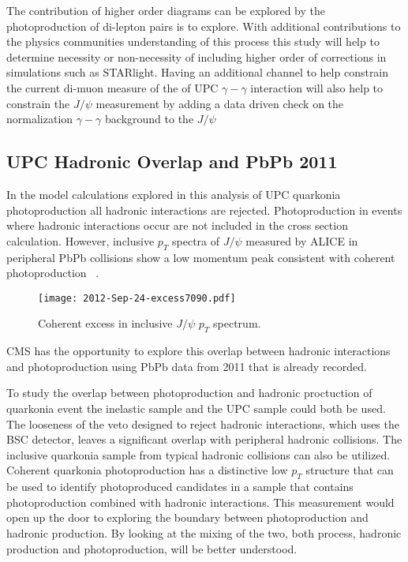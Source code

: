       The contribution of higher order diagrams can be explored by the 
	photoproduction of di-lepton pairs is to explore.
      With additional contributions to the physics communities understanding of 
	this process this study will help to determine necessity or 
	non-necessity of including higher order of corrections in simulations 
	such as STARlight.
      Having an additional channel to help constrain the current di-muon measure 
	of the of UPC $\gamma-\gamma$ interaction will also help to constrain 
	the $J/\psi$ measurement by adding a data driven check on the 
	normalization $\gamma-\gamma$ background to the $J/\psi$
      
    \subsection{UPC Hadronic Overlap and PbPb 2011}
      In the model calculations explored in this analysis of UPC quarkonia 
        photoproduction all hadronic interactions are rejected.
      Photoproduction in events where hadronic interactions occur are not 
        included in the cross section calculation.
      However, inclusive $p_{T}$ spectra of $J/\psi$ measured by ALICE in 
        peripheral PbPb collisions show a low momentum peak consistent with 
				coherent photoproduction ~\cite{aliceIclJpsi}.
			\begin{figure}[h]
				\centering
				\texttt{[image: 2012-Sep-24-excess7090.pdf]}
				\caption{Coherent excess in inclusive $J/\psi$ $p_{T}$ spectrum.}
				\label{fig:alicePtSpecLowPt}
			\end{figure}
		  CMS has the opportunity to explore this overlap between hadronic 
				interactions and photoproduction using PbPb data from 2011 that is 
				already recorded.

      To study the overlap between photoproduction and hadronic proctuction of 
				quarkonia event the inelastic sample and the UPC sample could both be
				used. 
      The looseness of the veto designed to reject hadronic interactions,
        which uses the BSC detector, leaves a significant overlap with 
				peripheral hadronic collisions. 
      The inclusive quarkonia sample from typical hadronic collisions can also 
        be utilized. 
      Coherent quarkonia photoproduction has a distinctive low $p_{T}$ structure
				that can be used to identify photoproduced candidates in a sample that 
				contains photoproduction combined with hadronic interactions.
      This measurement would open up the door to exploring the boundary between
				photoproduction and hadronic production.
      By looking at the mixing of the two, both process, hadronic production and 
				photoproduction, will be better understood.

